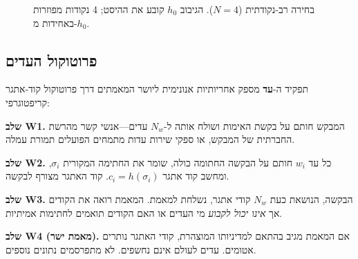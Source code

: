 \documentclass[11pt,a4paper,twocolumn]{article}
\begin{document}
\begin{figure}[ht]
\centering
{}
\caption{בחירה רב-נקודתית ($N{=}4$). הגיבוב $h_0$ קובע את ההיסט; 4 נקודות מפוזרות באחידות מ-$h_0$.}
\label{fig:multipoint}
\end{figure}

\subsection{פרוטוקול העדים}

תפקיד ה-\textbf{עד} מספק אחריותיות אנונימית ליושר המאמתים דרך פרוטוקול קוד-אתגר קריפטוגרפי:

\textbf{שלב W1.} המבקש חותם על בקשת האימות ושולח אותה ל-$N_w$ עדים---אנשי קשר מהרשת החברתית של המבקש, או ספקי שירות עדות מתמחים הפועלים תמורת עמלה.

\textbf{שלב W2.} כל עד $w_i$ חותם על הבקשה החתומה כולה, שומר את החתימה המקורית $\sigma_i$, ומחשב קוד אתגר $c_i = h(\sigma_i)$. קוד האתגר מצורף לבקשה.

\textbf{שלב W3.} הבקשה, הנושאת כעת $N_w$ קודי אתגר, נשלחת למאמת. המאמת רואה את הקודים אך \emph{אינו יכול לקבוע} מי העדים או האם הקודים תואמים לחתימות אמיתיות.

\textbf{שלב W4 (מאמת ישר).} אם המאמת מגיב בהתאם למדיניותו המוצהרת, קודי האתגר נותרים אטומים. עדים לעולם אינם נחשפים. לא מתפרסמים נתונים נוספים.
\end{document}
